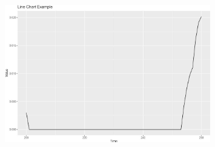 \documentclass[../main.tex]{subfiles}
\begin{document}
\begin{CJK*}{UTF8}{gbsn}
\begin{figure}[H]
  \centering
  \includegraphics[width=0.8\textwidth]{3D.JPG}
  \label{fig:mesh1}
\end{figure}



\end{CJK*}
\end{document}
